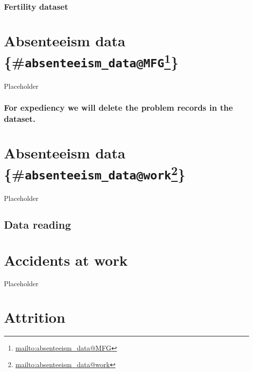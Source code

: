 \documentclass[12pt, krantz2,]{krantz}
\renewcommand{\href}[2]{#2\footnote{\url{#1}}}
\begin{document}
\hypertarget{fertility-dataset}{%
\subsection{Fertility dataset}\label{fertility-dataset}}

\hypertarget{absenteeism-data-absenteeism_datamfg}{%
\chapter{\texorpdfstring{Absenteeism data \{\#\href{mailto:absenteeism_data@MFG}{\nolinkurl{absenteeism\_data@MFG}}\}}{Absenteeism data \{\#absenteeism\_data@MFG\}}}\label{absenteeism-data-absenteeism_datamfg}}

Placeholder

\hypertarget{for-expediency-we-will-delete-the-problem-records-in-the-dataset.}{%
\subsection{For expediency we will delete the problem records in the dataset.}\label{for-expediency-we-will-delete-the-problem-records-in-the-dataset.}}

\hypertarget{absenteeism-data-absenteeism_datawork}{%
\chapter{\texorpdfstring{Absenteeism data \{\#\href{mailto:absenteeism_data@work}{\nolinkurl{absenteeism\_data@work}}\}}{Absenteeism data \{\#absenteeism\_data@work\}}}\label{absenteeism-data-absenteeism_datawork}}

Placeholder

\hypertarget{data-reading}{%
\section{Data reading}\label{data-reading}}

\hypertarget{accidents_at_work}{%
\chapter{Accidents at work}\label{accidents_at_work}}

Placeholder

\hypertarget{attrition}{%
\chapter{Attrition}\label{attrition}}
\end{document}
